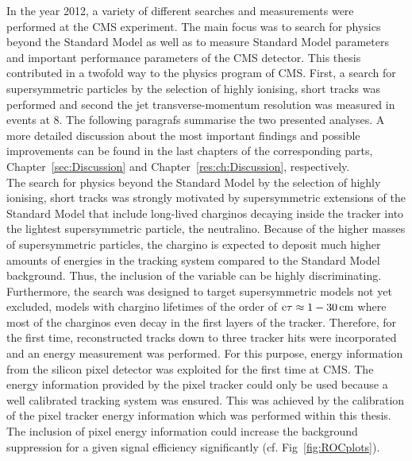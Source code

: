 In the year 2012, a variety of different searches and measurements were performed at the CMS experiment.
The main focus was to search for physics beyond the Standard Model as well as to measure Standard Model parameters and important performance parameters of the CMS detector.
This thesis contributed in a twofold way to the physics program of CMS.
First, a search for supersymmetric particles by the selection of highly ionising, short tracks was performed and second the jet transverse-momentum resolution was measured in \GAMJET events at 8\tev.
The following paragrafs summarise the two presented analyses.
A more detailed discussion about the most important findings and possible improvements can be found in the last chapters of the corresponding parts, Chapter~\ref{sec:Discussion} and Chapter~\ref{res:ch:Discussion}, respectively.\\

The search for physics beyond the Standard Model by the selection of highly ionising, short tracks was strongly motivated by supersymmetric extensions of the Standard Model that include long-lived charginos decaying inside the tracker into the lightest supersymmetric particle, the neutralino.
Because of the higher masses of supersymmetric particles, the chargino is expected to deposit much higher amounts of energies in the tracking system compared to the Standard Model background.
Thus, the inclusion of the variable \dedx can be highly discriminating.
Furthermore, the search was designed to target supersymmetric models not yet excluded, \ie models with chargino lifetimes of the order of $\text{c}\tau \approx 1- 30\,\text{cm}$ where most of the charginos even decay in the first layers of the tracker.
Therefore, for the first time, reconstructed tracks down to three tracker hits were incorporated and an energy measurement was performed.
For this purpose, energy information from the silicon pixel detector was exploited for the first time at CMS.
The energy information provided by the pixel tracker could only be used because a well calibrated tracking system was ensured.
This was achieved by the calibration of the pixel tracker energy information which was performed within this thesis.
The inclusion of pixel energy information could increase the background suppression for a given signal efficiency significantly (cf. Fig~\ref{fig:ROCplots}).

